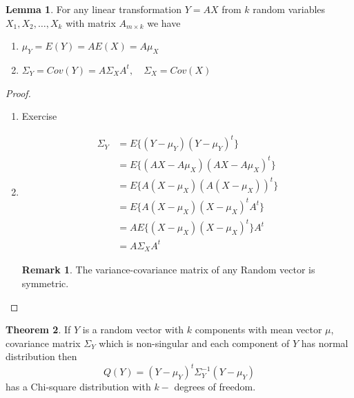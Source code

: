 \documentclass[11pt,a4paper]{article}
\theoremstyle{definition}
\newtheorem{thm}{Theorem}[subsection]
\newtheorem*{remark}{Remark}
\newtheorem{lem}[thm]{Lemma}
\begin{document}
\begin{lem}\label{res:lem:1.2.5}
For any linear transformation $Y=AX$ from $k$ random variables $X_1,X_2,\ldots ,X_k$ with matrix $A_{m\times k}$ we have
\begin{enumerate}
\item[i.] $\mu_Y=E(Y)=AE(X)=A\mu_X$
\item[ii.] $\Sigma_Y=Cov(Y)=A\Sigma_XA^t,\quad  \Sigma_X=Cov(X)$\\
\end{enumerate}
\end{lem}


\begin{proof}
\begin{enumerate}
\item[i.] Exercise



\item[ii.]
\begin{align*}
\Sigma_Y & = E\Big\{(Y-\mu_Y)(Y-\mu_Y)^t\Big\}\\
         & = E\Big\{(AX-A\mu_X)(AX-A\mu_X)^t\Big\}\\
         & = E\Big\{A(X-\mu_X)(A(X-\mu_X))^t\Big\}\\
         & = E\Big\{A(X-\mu_X)(X-\mu_X)^tA^t\Big\}\\
         & = AE\Big\{(X-\mu_X)(X-\mu_X)^t\Big\}A^t\\
         & = A\Sigma_XA^t
\end{align*}
\begin{remark}
The variance-covariance matrix of any Random vector is symmetric.
\end{remark}
\end{enumerate}
\end{proof}


\begin{thm}\label{res:thm:1.2.6}
If $Y$ is a random vector with $k$ components with mean vector $\mu$, covariance matrix $\Sigma_Y$ which is non-singular and each component of $Y$ has normal distribution then  $$Q(Y) = (Y-\mu_Y)^t\Sigma^{-1}_Y(Y-\mu_Y)$$ has   a Chi-square distribution with $k-$ degrees of freedom.
\end{thm}
\end{document}
